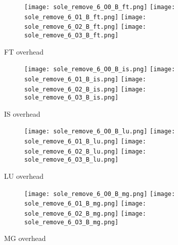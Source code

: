 \documentclass[11pt]{article}
\begin{document}
    \begin{figure}[!ht]
        \begin{subfigure}{\linewidth}
            \texttt{[image: sole\_remove\_6\_O0\_B\_ft.png]}
            \texttt{[image: sole\_remove\_6\_O1\_B\_ft.png]}
            \texttt{[image: sole\_remove\_6\_O2\_B\_ft.png]}
            \texttt{[image: sole\_remove\_6\_O3\_B\_ft.png]}
        \end{subfigure}\par\medskip
        \caption{FT overhead}
    \end{figure}
\begin{figure}[!ht]
        \begin{subfigure}{\linewidth}
            \texttt{[image: sole\_remove\_6\_O0\_B\_is.png]}\hfill
            \texttt{[image: sole\_remove\_6\_O1\_B\_is.png]}\hfill
            \texttt{[image: sole\_remove\_6\_O2\_B\_is.png]}\hfill
            \texttt{[image: sole\_remove\_6\_O3\_B\_is.png]}\hfill
        \end{subfigure}\par\medskip
        \caption{IS overhead}
\end{figure}

    \begin{figure}[!ht]
        \begin{subfigure}{\linewidth}
            \texttt{[image: sole\_remove\_6\_O0\_B\_lu.png]}\hfill
            \texttt{[image: sole\_remove\_6\_O1\_B\_lu.png]}\hfill
            \texttt{[image: sole\_remove\_6\_O2\_B\_lu.png]}\hfill
            \texttt{[image: sole\_remove\_6\_O3\_B\_lu.png]}\hfill
        \end{subfigure}\par\medskip
        \caption{LU overhead}
    \end{figure}

    \begin{figure}[!ht]
        \begin{subfigure}{\linewidth}
            \texttt{[image: sole\_remove\_6\_O0\_B\_mg.png]}\hfill
            \texttt{[image: sole\_remove\_6\_O1\_B\_mg.png]}\hfill
            \texttt{[image: sole\_remove\_6\_O2\_B\_mg.png]}\hfill
            \texttt{[image: sole\_remove\_6\_O3\_B\_mg.png]}\hfill
        \end{subfigure}\par\medskip
        \caption{MG overhead}
    \end{figure}
\end{document}
